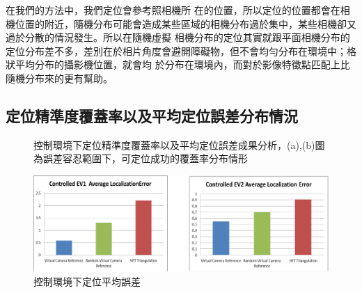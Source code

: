 在我們的方法中，我們定位會參考照相機所
在的位置，所以定位的位置都會在相機位置的附近，隨機分布可能會造成某些區域的相機分布過於集中，某些相機卻又過於分散的情況發生。所以在隨機虛擬
相機分布的定位其實就跟平面相機分布的定位分布差不多，差別在於相片角度會避開障礙物，但不會均勻分布在環境中；格狀平均分布的攝影機位置，就會均
於分布在環境內，而對於影像特徵點匹配上比隨機分布來的更有幫助。


\subsection{定位精準度覆蓋率以及平均定位誤差分布情況}	
	
\begin{figure}
	\begin{center}
	\end{center}
  \caption{控制環境下定位精準度覆蓋率以及平均定位誤差成果分析，(a),(b)圖為誤差容忍範圍下，可定位成功的覆蓋率分布情形}
  \label{fig:Controlled_EV_Result}	
\end{figure}	

\begin{figure}
\begin{center}
  \includegraphics[width=1.0\textwidth]{figures/Controlled_Average_Result.eps}
  \caption{控制環境下定位平均誤差}
  \label{fig:Controlled_AVG_Error}
\end{center}
\end{figure}

